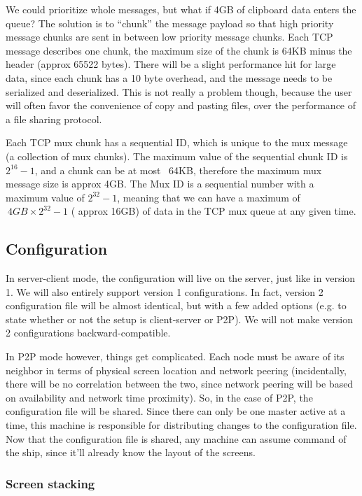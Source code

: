 We could prioritize whole messages, but what if 4GB of clipboard data enters
the queue? The solution is to ``chunk'' the message payload so that high 
priority message chunks are sent in between low priority message chunks. Each TCP
message describes one chunk, the maximum size of the chunk is 64KB minus the 
header (approx 65522 bytes). There will be a slight performance hit for large
data, since each chunk has a 10 byte overhead, and the message needs to be 
serialized and deserialized. This is not really a problem though, because the
user will often favor the convenience of copy and pasting files, over the 
performance of a file sharing protocol.

Each TCP mux chunk has a sequential ID, which is unique to the mux message
(a collection of mux chunks). The maximum value of the sequential chunk ID is
$2^{16}-1$, and a chunk can be at most ~64KB, therefore the maximum mux message
size is approx 4GB. The Mux ID is a sequential number with a maximum value of 
$2^{32}-1$, meaning that we can have a maximum of $~4GB \times 2^{32}-1$ (
approx 16GB) of data in the TCP mux queue at any given time.

\subsection{Configuration}

In server-client mode, the configuration will live on the server, just like in
version 1. We will also entirely support version 1 configurations. In fact, 
version 2 configuration file will be almost identical, but with a few added
options (e.g. to state whether or not the setup is client-server or P2P). We 
will not make version 2 configurations backward-compatible.

In P2P mode however, things get complicated. Each node must be aware of its
neighbor in terms of physical screen location and network peering
(incidentally, there will be no correlation between the two, since network 
peering will be based on availability and network time proximity). So, in the
case of P2P, the configuration file will be shared. Since there can only be
one master active at a time, this machine is responsible for distributing
changes to the configuration file. Now that the configuration file is shared,
any machine can assume command of the ship, since it'll already know the layout
of the screens.

\subsubsection{Screen stacking}

